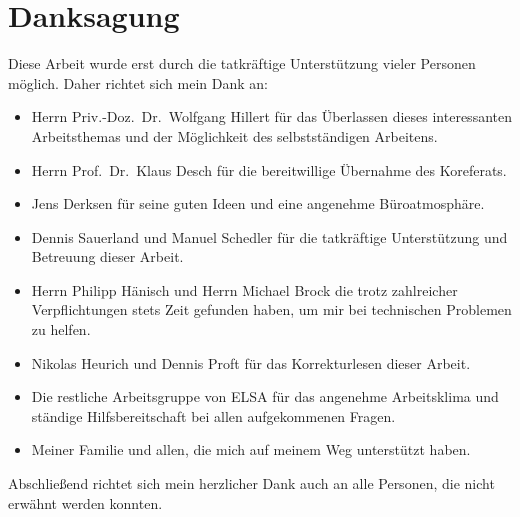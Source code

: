 \chapter*{Danksagung}
\label{sec:danksagung}
Diese Arbeit wurde erst durch die tatkräftige Unterstützung vieler Personen möglich.
Daher richtet sich mein Dank an:
\begin{itemize}
	\item Herrn Priv.-Doz.\ Dr.\ Wolfgang Hillert für das Überlassen dieses interessanten Arbeitsthemas und der Möglichkeit des selbstständigen Arbeitens.
	
	\item Herrn Prof.\ Dr.\ Klaus Desch für die bereitwillige Übernahme des Koreferats.
	
	\item Jens Derksen für seine guten Ideen und eine angenehme Büroatmosphäre.
	
	\item Dennis Sauerland und Manuel Schedler für die tatkräftige Unterstützung und Betreuung dieser Arbeit.
	
	\item Herrn Philipp Hänisch und Herrn Michael Brock die trotz zahlreicher Verpflichtungen stets Zeit gefunden haben, um mir bei technischen Problemen zu helfen.
	
	\item Nikolas Heurich und Dennis Proft für das Korrekturlesen dieser Arbeit.
	
	\item Die restliche Arbeitsgruppe von ELSA für das angenehme Arbeitsklima und ständige Hilfsbereitschaft bei allen aufgekommenen Fragen.
	
	\item Meiner Familie und allen, die mich auf meinem Weg unterstützt haben.
\end{itemize}
Abschließend richtet sich mein herzlicher Dank auch an alle Personen, die nicht erwähnt werden konnten.